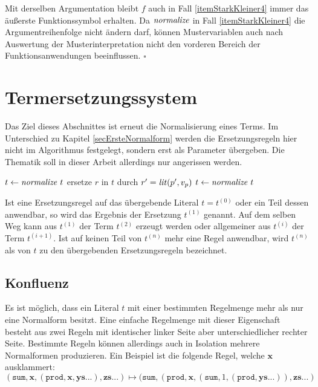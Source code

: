 Mit derselben Argumentation bleibt $f$ auch in Fall \ref{itemStarkKleiner4} immer das äußerste Funktionssymbol erhalten. 
Da $\mathit{normalize}$ in Fall \ref{itemStarkKleiner4} die Argumentreihenfolge nicht ändern darf, können Mustervariablen auch nach Auswertung der Musterinterpretation nicht den vorderen Bereich der Funktionsanwendungen beeinflussen.  
\hfill $\square$\\



\section{Termersetzungssystem} \label{subsecTermersetzungssystem}

Das Ziel dieses Abschnittes ist erneut die Normalisierung eines Terms. Im Unterschied zu Kapitel \ref{secErsteNormalform} werden die Ersetzungsregeln hier nicht im Algorithmus festgelegt, sondern erst als Parameter übergeben. Die Thematik soll in dieser Arbeit allerdings nur angerissen werden.

\begin{algorithm}
\DontPrintSemicolon
\caption{$\Const{applyRuleset} \colon \mathit{Regelmenge} \times T \rightarrow T$ }\label{algoTES}
$t \leftarrow \mathit{normalize}~t$\;
 {
    ersetze $r$ in $t$ durch $r' = \mathit{lit}(p', v_p)$\;
    $t \leftarrow \mathit{normalize}~t$\;
}
\end{algorithm}

Ist eine Ersetzungsregel auf das übergebende Literal $t = t^{(0)}$ oder ein Teil dessen anwendbar, so wird das Ergebnis der Ersetzung $t^{(1)}$ genannt. Auf dem selben Weg kann aus $t^{(1)}$ der Term $t^{(2)}$ erzeugt werden oder allgemeiner aus $t^{(i)}$ der Term $t^{(i+1)}$. Ist auf keinen Teil von $t^{(n)}$ mehr eine Regel anwendbar, wird $t^{(n)}$ als  von $t$ zu den übergebenden Ersetzungsregeln bezeichnet. 



\subsection {Konfluenz} \label{subsubsecKonfluenz}
Es ist möglich, dass ein Literal $t$ mit einer bestimmten Regelmenge mehr als nur eine Normalform besitzt. Eine einfache Regelmenge mit dieser Eigenschaft besteht aus zwei Regeln mit identischer linker Seite aber unterschiedlicher rechter Seite. Bestimmte Regeln können allerdings auch in Isolation mehrere Normalformen produzieren. Ein Beispiel ist die folgende Regel, welche $\mathbf x$ ausklammert:
$$(\texttt{sum}, \mathbf x, (\texttt{prod}, \mathbf x, \mathbf{ys...}), \mathbf{zs...}) 
\mapsto (\texttt{sum}, (\texttt{prod}, \mathbf x, (\texttt{sum}, 1, (\texttt{prod}, \mathbf{ys...})) , \mathbf{zs...})$$

